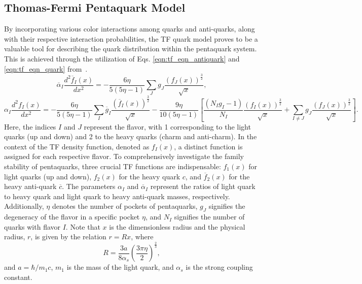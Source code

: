 \documentclass[fleqn]{article}
\begin{document}
    \subsection{Thomas-Fermi Pentaquark Model}
    \label{subsection:tfqm}
        
        By incorporating various color interactions among quarks and anti-quarks, along with their respective interaction probabilities, the TF quark model proves to be a valuable tool for describing the quark distribution within the pentaquark system. This is achieved through the utilization of Eqs. \eqref{eqn:tf_eqn_antiquark} and \eqref{eqn:tf_eqn_quark} from~\cite{giri2021investigation}.
        \begin{equation}
        \overline{\alpha}_I \frac{d^2\overline{f}_I(x)}{dx^2}= -\frac{6\eta}{5(5\eta-1)} \sum_J g_J \frac{(f_J(x))^\frac{3}{2}}{\sqrt{x}},
        \label{eqn:tf_eqn_antiquark}
        \end{equation} 
        \begin{equation}
        \alpha_I \frac{d^2 f_I(x)}{dx^2}=-\frac{6\eta}{5(5\eta-1)}\sum_I \overline{g}_I \frac{\left( \overline{f}_I(x) \right)^\frac{3}{2}}{\sqrt{x}} - \frac{9\eta}{10(5\eta-1)}\left[\frac{(N_I g_I-1)}{N_I} \frac{\left( f_I(x) \right)^\frac{3}{2}}{\sqrt{x}}
         +\sum_{I \ne J} g_J \frac{\left( f_J(x) \right)^\frac{3}{2}}{\sqrt{x}} \right].
        \label{eqn:tf_eqn_quark}
        \end{equation}
        Here, the indices $I$ and $J$ represent the flavor, with 1 corresponding to the light quarks (up and down) and 2 to the heavy quarks (charm and anti-charm). In the context of the TF density function, denoted as $f_I(x)$, a distinct function is assigned for each respective flavor. To comprehensively investigate the family stability of pentaquarks, three crucial TF functions are indispensable: $f_1(x)$ for light quarks (up and down), $f_2(x)$ for the heavy quark $c$, and $\overline{f}_{2}(x)$ for the heavy anti-quark $\overline{c}$. The parameters $\alpha_I$ and $\overline{\alpha}_I$ represent the ratios of light quark to heavy quark and light quark to heavy anti-quark masses, respectively. Additionally, $\eta$ denotes the number of pockets of pentaquarks, $g_J$ signifies the degeneracy of the flavor in a specific pocket $\eta$, and $N_I$ signifies the number of quarks with flavor $I$. Note that $x$ is the dimensionless radius and the physical radius, $r$, is given by the relation  $r = Rx$, where  
        \begin{equation}
        R=\frac{3 a}{8\alpha_{s}}  \left(\frac{ 3 \pi \eta}{2} \right)^\frac{2}{3},
        \label{eqn:radius_constant}
        \end{equation}
        and $ a=\hbar / m_{1} c$, $m_{1}$ is the mass of the light quark, and $\alpha_{s}$ is the strong coupling constant.
        
\end{document}
